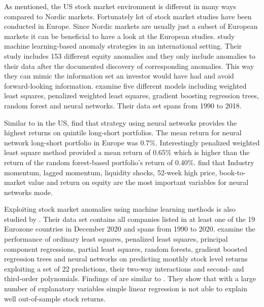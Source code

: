\documentclass[12pt]{article}
\begin{document}
As mentioned, the US stock market environment is different in many ways compared to Nordic markets. Fortunately lot of stock market studies have been conducted in Europe. Since Nordic markets are usually just a subset of European markets it can be beneficial to have a look at the European studies. \citet{TOBEK2021100588} study machine learning-based anomaly strategies in an international setting. Their study includes 153 different equity anomalies and they only include anomalies to their data after the documented discovery of corresponding anomalies. This way they can mimic the information set an investor would have had and avoid forward-looking information. \citeauthor{TOBEK2021100588} examine five different models including weighted least squares, penalized weighted least squares, gradient boosting regression trees, random forest and neural networks. Their data set spans from 1990 to 2018. \par

Similar to \citet{guetal} in the US, \citeauthor{TOBEK2021100588} find that strategy using neural networks provides the highest returns on quintile long-short portfolios. The mean return for neural network long-short portfolio in Europe was 0.7\%. Interestingly penalized weighted least square method provided a mean return of 0.65\% which is higher than the return of the random forest-based portfolio's return of 0.40\%. \citeauthor{TOBEK2021100588} find that Industry momentum, lagged momentum, liquidity shocks, 52-week high price, book-to-market value and return on equity are the most important variables for neural networks mode\footnotemark. \par


Exploiting stock market anomalies using machine learning methods is also studied by \citet{Drobetz}. Their data set contains all companies listed in at least one of the 19 Eurozone countries in December 2020 and spans from 1990 to 2020\footnotemark. \citeauthor{Drobetz} examine the performance of ordinary least squares, penalized least squares, principal component regressions, partial least squares, random forests, gradient boosted regression trees and neural networks on predicting monthly stock level returns exploiting a set of 22 predictions, their two-way interactions and second- and third-order polynomials. Findings of \citeauthor{Drobetz} are similar to \citet{guetal}. They show that with a large number of explanatory variables simple linear regression is not able to explain well out-of-sample stock returns. \par
\end{document}
